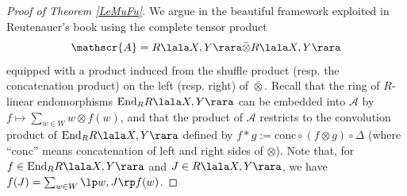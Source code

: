 \begin{proof}[Proof of Theorem \ref{LeMuFu}]
We argue in the beautiful framework exploited in Reutenauer's book \cite[1.5]{Reu}
using the complete tensor product
$$
\mathscr{A}=R\lala X,Y\rara \bar\otimes R\lala X,Y\rara
$$
equipped with a product induced from 
the shuffle product (resp. the concatenation product)
on the left (resp. right) of $\bar\otimes$. 
Recall that the ring of
$R$-linear endomorphisms $\mathrm{End}_RR\lala X,Y\rara$
can be embedded into $\mathscr{A}$ by 
$f\mapsto \sum_{w\in W} w\otimes f(w)$, and that the product of 
$\mathscr{A}$ restricts to the convolution product of $\mathrm{End}_RR\lala X,Y\rara$
defined by $f\ast g:=\mathrm{conc}\circ(f\otimes g)\circ \Delta$
(where ``$\mathrm{conc}$'' means concatenation of left and right sides of $\otimes$).
Note that, for $f\in\mathrm{End}_R R\lala X,Y\rara$ and  $J\in R\lala X,Y\rara$,
we have $f(J)=\sum_{w\in W} \lp w,J\rp f(w)$.


\end{proof}
